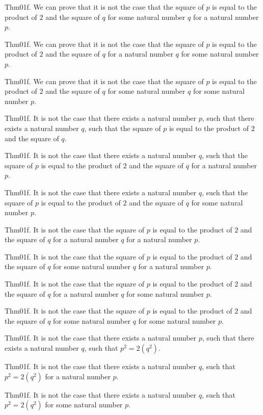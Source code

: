 \documentclass{article}
\begin{document}
Thm01f. We can prove that it is not the case that the square of $p$ is equal to the product of $2$ and the square of $q$ for some natural number $q$ for a natural number $p$.

Thm01f. We can prove that it is not the case that the square of $p$ is equal to the product of $2$ and the square of $q$ for a natural number $q$ for some natural number $p$.

Thm01f. We can prove that it is not the case that the square of $p$ is equal to the product of $2$ and the square of $q$ for some natural number $q$ for some natural number $p$.

Thm01f. It is not the case that there exists a natural number $p$, such that there exists a natural number $q$, such that the square of $p$ is equal to the product of $2$ and the square of $q$.

Thm01f. It is not the case that there exists a natural number $q$, such that the square of $p$ is equal to the product of $2$ and the square of $q$ for a natural number $p$.

Thm01f. It is not the case that there exists a natural number $q$, such that the square of $p$ is equal to the product of $2$ and the square of $q$ for some natural number $p$.

Thm01f. It is not the case that the square of $p$ is equal to the product of $2$ and the square of $q$ for a natural number $q$ for a natural number $p$.

Thm01f. It is not the case that the square of $p$ is equal to the product of $2$ and the square of $q$ for some natural number $q$ for a natural number $p$.

Thm01f. It is not the case that the square of $p$ is equal to the product of $2$ and the square of $q$ for a natural number $q$ for some natural number $p$.

Thm01f. It is not the case that the square of $p$ is equal to the product of $2$ and the square of $q$ for some natural number $q$ for some natural number $p$.

Thm01f. It is not the case that there exists a natural number $p$, such that there exists a natural number $q$, such that $p ^{ 2}= 2 (q ^{ 2})$.

Thm01f. It is not the case that there exists a natural number $q$, such that $p ^{ 2}= 2 (q ^{ 2})$ for a natural number $p$.

Thm01f. It is not the case that there exists a natural number $q$, such that $p ^{ 2}= 2 (q ^{ 2})$ for some natural number $p$.
\end{document}

